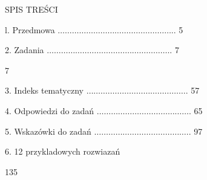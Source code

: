 \documentclass[a4paper,12pt]{article}
\begin{document}
SPIS TREŚCI

l. Przedmowa $\ldots\ldots\ldots\ldots\ldots\ldots\ldots\ldots\ldots\ldots\ldots\ldots\ldots\ldots\ldots\ldots$.. 5

2. Zadania $\ldots\ldots\ldots\ldots\ldots\ldots\ldots\ldots\ldots\ldots\ldots\ldots\ldots\ldots\ldots\ldots\ldots$.. 7

7

3. Indeks tematyczny $\ldots\ldots\ldots\ldots\ldots\ldots\ldots\ldots\ldots\ldots\ldots\ldots\ldots\ldots$. 57

4. Odpowiedzi do zadań $\ldots\ldots\ldots\ldots\ldots\ldots\ldots\ldots\ldots\ldots\ldots\ldots\ldots$. 65

5. Wskazówki do zadań $\ldots\ldots\ldots\ldots\ldots\ldots\ldots\ldots\ldots\ldots\ldots\ldots\ldots$.. 97

6. 12 przykladowych rozwiazań

135
\end{document}
